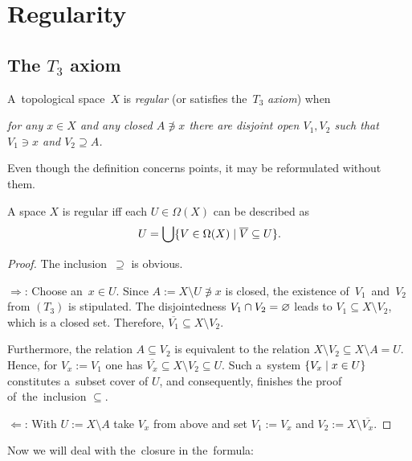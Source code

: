 \chapter{Regularity}

\section{The $T_3$ axiom}

\begin{framed}
  \begin{df}[$T_3$]
    A~topological space~$X$ is \emph{regular\/} (or satisfies the~$T_3$
    \emph{axiom\/}) when
    \begin{center} \it
      for any $x\in X$ and any closed $A \not\owns x$ there are disjoint open
      $V_1, V_2$ such that $V_1\owns x$ and $V_2\supseteq A$.
    \end{center}
  \end{df}
\end{framed}

Even though the definition concerns points, it may be reformulated without
them.

\begin{prop} \label{topreg-char}
  A space $X$ is regular iff each $U\in \Omega(X)$ can be described as
  \[
    U = \bigcup \{V\in \Omega(X) \mid \overline{V} \subseteq U\}.
  \]
\end{prop}
\begin{proof}
  The inclusion~$\supseteq$ is obvious.

  $\Rightarrow$:
  Choose an~$x\in U$.
  Since $A := X\setminus U \not\owns x$ is closed, the existence
  of~$V_1$~and~$V_2$ from $(T_3)$ is stipulated.
  The disjointedness $V_1 \cap V_2 = \varnothing$ leads to $V_1\subseteq X\setminus
  V_2$, which is a closed set.
  Therefore, $\overline{V_1}\subseteq X\setminus V_2$.

  Furthermore, the relation $A\subseteq V_2$ is equivalent to the relation
  $X\setminus V_2\subseteq X \setminus A = U$.
  Hence, for $V_x := V_1$ one has $\overline{V_x}\subseteq X\setminus V_2\subseteq
  U$.
  Such a~system $\{V_x \mid x\in U\}$ constitutes a~subset cover of $U$, and
  consequently, finishes the proof of~the~inclusion $\subseteq$.

  $\Leftarrow$:
  With $U := X\setminus A$ take $V_x$ from above and set $V_1 := V_x$ and $V_2
  := X\setminus \overline{V_x}$.
\end{proof}

Now we will deal with the~closure in the~formula:

